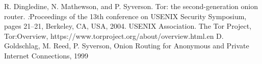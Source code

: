 \documentclass[a4paper]{article}
\begin{document}
\begin{thebibliography}{50}
		R. Dingledine, N. Mathewson, and P. Syverson. 
		Tor: the second-generation onion router. 
		\textsl:{Proceedings of the 13th conference on USENIX Security Symposium}, 
		pages 21–21, Berkeley, CA, USA, 2004.
		USENIX Association.
		The Tor Project,
		Tor:Overview,
		https://www.torproject.org/about/overview.html.en		
		D. Goldschlag, M. Reed, P. Syverson,
		Onion Routing for Anonymous and Private Internet Connections,
		1999	
		
\end{thebibliography}
\end{document}
